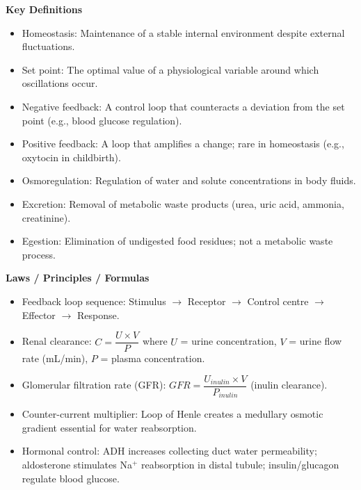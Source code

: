 \documentclass[11pt]{article}
\newcommand{\cle}[1]{{\popxbold\color{popdark}#1}}
\begin{document}
\begin{bilan}
\textbf{Key Definitions}
\begin{itemize}
\item \cle{Homeostasis}: Maintenance of a stable internal environment despite external fluctuations.
\item \cle{Set point}: The optimal value of a physiological variable around which oscillations occur.
\item \cle{Negative feedback}: A control loop that counteracts a deviation from the set point (e.g., blood glucose regulation).
\item \cle{Positive feedback}: A loop that amplifies a change; rare in homeostasis (e.g., oxytocin in childbirth).
\item \cle{Osmoregulation}: Regulation of water and solute concentrations in body fluids.
\item \cle{Excretion}: Removal of metabolic waste products (urea, uric acid, ammonia, creatinine).
\item \cle{Egestion}: Elimination of undigested food residues; not a metabolic waste process.
\end{itemize}

\textbf{Laws / Principles / Formulas}
\begin{itemize}
\item \cle{Feedback loop sequence}: Stimulus $\to$ Receptor $\to$ Control centre $\to$ Effector $\to$ Response.
\item \cle{Renal clearance}: $C = \dfrac{U \times V}{P}$ where $U$ = urine concentration, $V$ = urine flow rate (mL/min), $P$ = plasma concentration.
\item \cle{Glomerular filtration rate (GFR)}: $GFR = \dfrac{U_{inulin} \times V}{P_{inulin}}$ (inulin clearance).
\item \cle{Counter-current multiplier}: Loop of Henle creates a medullary osmotic gradient essential for water reabsorption.
\item \cle{Hormonal control}: ADH increases collecting duct water permeability; aldosterone stimulates Na$^+$ reabsorption in distal tubule; insulin/glucagon regulate blood glucose.
\end{itemize}


\end{bilan}
\end{document}
